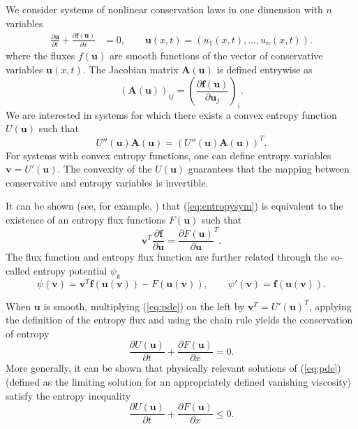 \documentclass[preprint,10pt]{article}
\theoremstyle{definition}
\theoremstyle{lemma}
\theoremstyle{theorem}
\theoremstyle{assumption}
\newcommand{\pd}[2]{\frac{\partial#1}{\partial#2}}
\newcommand{\LRp}[1]{\left( #1 \right)}
\newcommand{\note}[1]{{\color{blue}{#1}}}
\begin{document}

We consider systems of nonlinear conservation laws in one dimension with $n$ variables
\begin{align}
\pd{\bm{u}}{t} + \pd{\bm{f(\bm{u})}}{x} &= 0, \qquad \bm{u}(x,t) = (u_1(x,t),\ldots,u_n(x,t)).
\label{eq:pde}
\end{align}
where the fluxes $f(\bm{u})$ are smooth functions of the vector of conservative variables $\bm{u}({x},t)$.%
The Jacobian matrix $\bm{A}(\bm{u})$ is defined entrywise as
\[
\LRp{\bm{A}(\bm{u})}_{ij} = \LRp{\pd{\bm{f}(\bm{u})}{\bm{u}_j}}_i.
\]
We are interested in systems for which there exists a convex entropy function $U(\bm{u})$ such that  
\begin{equation}
U''(\bm{u})\bm{A}(\bm{u}) = \LRp{U''(\bm{u}) \bm{A}(\bm{u})}^T.
\label{eq:entropysym}
\end{equation}
For systems with convex entropy functions, one can define entropy variables $\bm{v} = U'(\bm{u})$.  The convexity of the $U(\bm{u})$ guarantees that the mapping between conservative and entropy variables is invertible.  

It can be shown (see, for example, \cite{mock1980systems}) that (\ref{eq:entropysym}) is equivalent to the existence of an entropy flux functions $F(\bm{u})$ such that
\[
\bm{v}^T \pd{\bm{f}}{\bm{u}} = \pd{F(\bm{u})}{\bm{u}}^T.
\]
The flux function and entropy flux function are further related through the so-called entropy potential $\psi_k$ 
\[
\psi(\bm{v}) = \bm{v}^T\bm{f}(\bm{u}(\bm{v})) - F(\bm{u}(\bm{v})), \qquad \psi'(\bm{v}) = \bm{f}(\bm{u}(\bm{v})).
\]

When $\bm{u}$ is smooth, multiplying (\ref{eq:pde}) on the left by $\bm{v}^T = U'(\bm{u})^T$, applying the definition of the entropy flux and using the chain rule yields the conservation of entropy
\[
\pd{U(\bm{u})}{t} + \pd{F(\bm{u})}{{x}} = 0.
\]
More generally, it can be shown that physically relevant solutions of (\ref{eq:pde}) (defined as the limiting solution for an appropriately defined vanishing viscosity) satisfy the entropy inequality
\[
\pd{U(\bm{u})}{t} + \pd{F(\bm{u})}{{x}} \leq 0.  
\]
\end{document}
